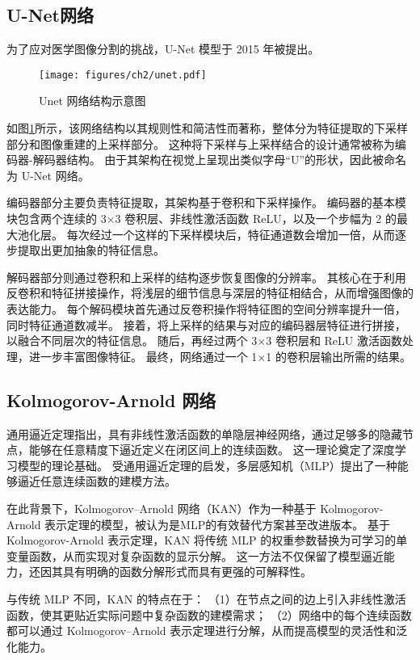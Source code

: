 \subsection{U-Net网络}
为了应对医学图像分割的挑战，U-Net 模型\cite{unet}于 2015 年被提出。
\begin{figure}
    \centering
    \texttt{[image: figures/ch2/unet.pdf]}
    \caption{Unet 网络结构示意图}
    \label{img:unet}
\end{figure}

如图\ref{img:unet}所示，该网络结构以其规则性和简洁性而著称，整体分为特征提取的下采样部分和图像重建的上采样部分。
这种将下采样与上采样结合的设计通常被称为编码器-解码器结构。
由于其架构在视觉上呈现出类似字母“U”的形状，因此被命名为 U-Net 网络。

编码器部分主要负责特征提取，其架构基于卷积和下采样操作。
编码器的基本模块包含两个连续的 3×3 卷积层、非线性激活函数 ReLU，以及一个步幅为 2 的最大池化层。
每次经过一个这样的下采样模块后，特征通道数会增加一倍，从而逐步提取出更加抽象的特征信息。

解码器部分则通过卷积和上采样的结构逐步恢复图像的分辨率。
其核心在于利用反卷积和特征拼接操作，将浅层的细节信息与深层的特征相结合，从而增强图像的表达能力。
每个解码模块首先通过反卷积操作将特征图的空间分辨率提升一倍，同时特征通道数减半。
接着，将上采样的结果与对应的编码器层特征进行拼接，以融合不同层次的特征信息。
随后，再经过两个 3×3 卷积层和 ReLU 激活函数处理，进一步丰富图像特征。
最终，网络通过一个 1×1 的卷积层输出所需的结果。

\subsection{Kolmogorov-Arnold 网络}
通用逼近定理\cite{universal_approximation}指出，具有非线性激活函数的单隐层神经网络，通过足够多的隐藏节点，能够在任意精度下逼近定义在闭区间上的连续函数。
这一理论奠定了深度学习模型的理论基础。
受通用逼近定理的启发，多层感知机（MLP）\cite{mlp}提出了一种能够逼近任意连续函数的建模方法。

在此背景下，Kolmogorov–Arnold 网络（KAN）\cite{kan}作为一种基于 Kolmogorov-Arnold 表示定理\cite{kan_theorem}的模型，被认为是MLP的有效替代方案甚至改进版本。
基于Kolmogorov-Arnold 表示定理，KAN 将传统 MLP 的权重参数替换为可学习的单变量函数，从而实现对复杂函数的显示分解。
这一方法不仅保留了模型逼近能力，还因其具有明确的函数分解形式而具有更强的可解释性。

与传统 MLP 不同，KAN 的特点在于：
（1）在节点之间的边上引入非线性激活函数，使其更贴近实际问题中复杂函数的建模需求；
（2）网络中的每个连续函数都可以通过 Kolmogorov–Arnold 表示定理进行分解，从而提高模型的灵活性和泛化能力。

